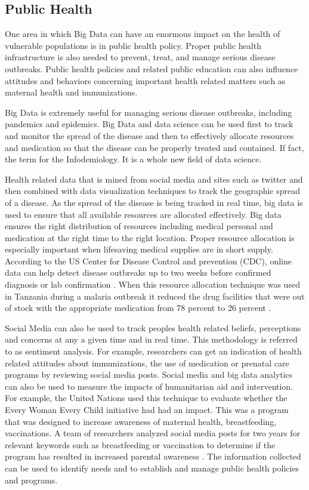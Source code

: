 \documentclass[sigconf]{acmart}
\begin{document}
\subsection{Public Health}
One area in which Big Data can have an enormous impact on the health of vulnerable populations is in public health policy. Proper public health infrastructure is also needed to prevent, treat, and manage serious disease outbreaks. Public health policies and related public education can also influence attitudes and behaviors concerning important health related matters such as maternal health and immunizations. 

Big Data is extremely useful for managing serious disease outbreaks, including pandemics and epidemics. Big Data and data science can be used first to track and monitor the spread of the disease and then to effectively allocate resources and medication so that the disease can be properly treated and contained. If fact, the term for the Infodemiology. It is a whole new field of data science.

Health related data that is mined from social media and sites such as twitter and then combined with data visualization techniques to track the geographic spread of a disease. As the spread of the disease is being tracked in real time, big data is used to ensure that all available resources are allocated effectively. Big data ensures the right distribution of resources including medical personal and medication at the right time to the right location. Proper resource allocation is especially important when lifesaving medical supplies are in short supply. According to the US Center for Disease Control and prevention (CDC), online data can help detect disease outbreaks up to two weeks before confirmed diagnosis or lab confirmation \cite{www-google-GloPls}. When this resource allocation technique was used in Tanzania during a malaria outbreak it reduced the drug facilities that were out of stock with the appropriate medication from 78 percent to 26 percent \cite{DevEcon}.

Social Media can also be used to track peoples health related beliefs, perceptions and concerns at any a given time and in real time. This methodology is referred to as sentiment analysis. For example, researchers can get an indication of health related attitudes about immunizations, the use of medication or prenatal care programs by reviewing social media posts. Social media and big data analytics can also be used to measure the impacts of humanitarian aid and intervention. For example, the United Nations used this technique to evaluate whether the Every Woman Every Child initiative had had an impact. This was a program that was designed to increase awareness of maternal health, breastfeeding, vaccinations. A team of researchers analyzed social media posts for two years for relevant keywords such as breastfeeding or vaccination to determine if the program has resulted in increased parental awareness \cite{DevEcon}.
The information collected can be used to identify needs and to establish and manage public health policies and programs.
\end{document}
